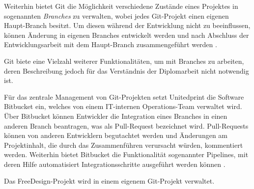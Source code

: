 Weiterhin bietet Git die Möglichkeit verschiedene Zustände eines Projektes in sogenannten \emph{Branches} zu verwalten, wobei jedes Git-Projekt einen eigenen Haupt-Branch besitzt. Um diesen während der 
Entwicklung nicht zu beeinflussen, können Änderung in eigenen Branches entwickelt werden und nach Abschluss der Entwicklungsarbeit mit dem Haupt-Branch zusammengeführt werden \autocite[vgl.][]{Git:Branching}. 

Git biete eine Vielzahl weiterer Funktionalitäten, um mit Branches zu arbeiten, deren Beschreibung jedoch für das Verständnis der Diplomarbeit nicht notwendig ist. 

Für das zentrale Management von Git-Projekten setzt Unitedprint die Software Bitbucket ein, welches von einem IT-internen Operations-Team verwaltet wird. Über Bitbucket können Entwickler die Integration eines Branches in einen anderen Branch beantragen, was als Pull-Request bezeichnet wird. Pull-Requests können von anderen Entwicklern begutachtet werden und Änderungen am Projektinhalt, die durch das Zusammenführen verursacht würden, kommentiert werden. Weiterhin bietet Bitbucket die Funktionalität sogenannter Pipelines, mit deren Hilfe automatisiert Integrationsschritte ausgeführt werden können \autocite[vgl.][]{Bitbucket:Product}.

Das FreeDesign-Projekt wird in einem eigenem Git-Projekt verwaltet.

